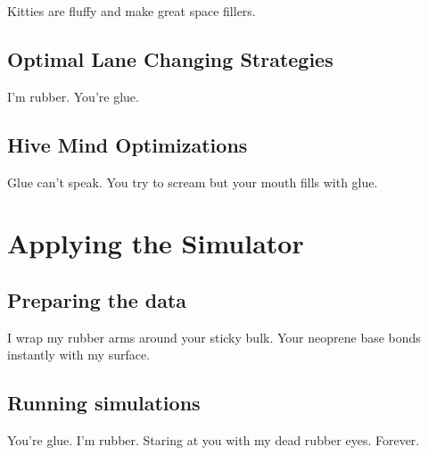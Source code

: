 Kitties are fluffy and make great space fillers.

\section{Optimal Lane Changing Strategies}
I’m rubber. You’re glue.

\section{Hive Mind Optimizations}
Glue can’t speak. You try to scream but your mouth fills with glue.

\chapter{Applying the Simulator}
\thispagestyle{fancy} %
\section{Preparing the data}
I wrap my rubber arms around your sticky bulk. Your neoprene base bonds instantly with my surface.
\section{Running simulations}
You’re glue. I’m rubber. Staring at you with my dead rubber eyes. Forever.


